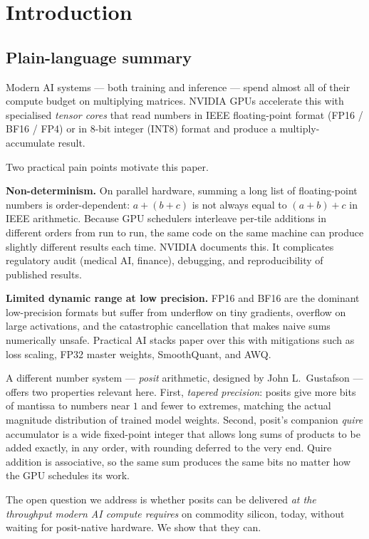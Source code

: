 \documentclass[11pt,a4paper]{article}
\begin{document}
\section{Introduction}

\subsection{Plain-language summary}

Modern AI systems --- both training and inference --- spend almost all
of their compute budget on multiplying matrices. NVIDIA GPUs accelerate
this with specialised \emph{tensor cores} that read numbers in IEEE
floating-point format (FP16 / BF16 / FP4) or in 8-bit integer (INT8)
format and produce a multiply-accumulate result.

Two practical pain points motivate this paper.

\textbf{Non-determinism.} On parallel hardware, summing a long list of
floating-point numbers is order-dependent: $a + (b + c)$ is not always
equal to $(a + b) + c$ in IEEE arithmetic. Because GPU schedulers
interleave per-tile additions in different orders from run to run,
the same code on the same machine can produce slightly different
results each time. NVIDIA documents this. It complicates regulatory
audit (medical AI, finance), debugging, and reproducibility of
published results.

\textbf{Limited dynamic range at low precision.} FP16 and BF16 are the
dominant low-precision formats but suffer from underflow on tiny
gradients, overflow on large activations, and the catastrophic
cancellation that makes naive sums numerically unsafe. Practical AI
stacks paper over this with mitigations such as loss scaling, FP32
master weights, SmoothQuant, and AWQ.

A different number system --- \emph{posit} arithmetic, designed by
John L.\ Gustafson \cite{gustafson_endoferror, gustafson_posits} ---
offers two properties relevant here. First, \emph{tapered precision}: posits give
more bits of mantissa to numbers near $1$ and fewer to extremes,
matching the actual magnitude distribution of trained model weights.
Second, posit's companion \emph{quire} accumulator is a wide
fixed-point integer that allows long sums of products to be added
exactly, in any order, with rounding deferred to the very end. Quire
addition is associative, so the same sum produces the same bits no
matter how the GPU schedules its work.

The open question we address is whether posits can be delivered \emph{at
the throughput modern AI compute requires} on commodity silicon, today,
without waiting for posit-native hardware. We show that they can.
\end{document}
